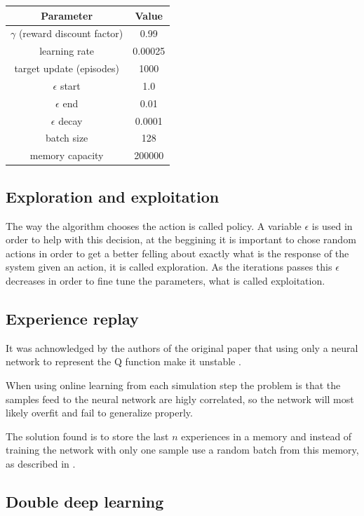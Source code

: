 \documentclass{article}
\begin{document}
\begin{center}
\begin{tabular}{ |c|c| }
 \hline
 \textbf{Parameter} & \textbf{Value} \\ 
 \hline
 $\gamma$ (reward discount factor) & 0.99 \\ 
 learning rate & 0.00025 \\
 target update (episodes) & 1000 \\ 
 $\epsilon$ start & 1.0 \\ 
 $\epsilon$ end & 0.01 \\ 
 $\epsilon$ decay & 0.0001 \\ 
 batch size & 128 \\ 
 memory capacity & 200000 \\ 
 \hline
\end{tabular}
\end{center}

\subsection{Exploration and exploitation}
The way the algorithm chooses the action is called policy. A variable $\epsilon$ is used in order to help with this decision, at the beggining it is important to chose random actions in order to get a better felling about exactly what is the response of the system given an action, it is called exploration. As the iterations passes this $\epsilon$ decreases in order to fine tune the parameters, what is called exploitation.

\subsection{Experience replay}
It was achnowledged by the authors of the original paper that using only a neural network to represent the Q function make it unstable \cite{deepQLearning}.

When using online learning from each simulation step the problem is that the samples feed to the neural network are higly correlated, so the network will most likely overfit and fail to generalize properly.

The solution found is to store the last $n$ experiences in a memory and instead of training the network with only one sample use a random batch from this memory, as described in \cite{experienceReplay}.

\subsection{Double deep learning}
\end{document}
